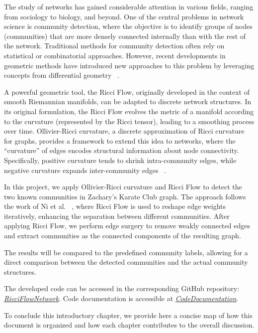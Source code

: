 The study of networks has gained considerable attention in various fields, ranging from sociology to biology, and beyond. One of the central problems in network science is community detection, where the objective is to identify groups of nodes (communities) that are more densely connected internally than with the rest of the network. Traditional methods for community detection often rely on statistical or combinatorial approaches. However, recent developments in geometric methods have introduced new approaches to this problem by leveraging concepts from differential geometry ~\cite{Ni:communitydetectionnetworksricci}.

A powerful geometric tool, the Ricci Flow, originally developed in the context of smooth Riemannian manifolds, can be adapted to discrete network structures. In its original formulation, the Ricci Flow evolves the metric of a manifold according to the curvature (represented by the Ricci tensor), leading to a smoothing process over time. Ollivier-Ricci curvature, a discrete approximation of Ricci curvature for graphs, provides a framework to extend this idea to networks, where the “curvature” of edges encodes structural information about node connectivity. Specifically, positive curvature tends to shrink intra-community edges, while negative curvature expands inter-community edges ~\cite{Ni:communitydetectionnetworksricci}.

In this project, we apply Ollivier-Ricci curvature and Ricci Flow to detect the two known communities in Zachary's Karate Club graph. The approach follows the work of Ni et al. ~\cite{Ni:communitydetectionnetworksricci}, where Ricci Flow is used to reshape edge weights iteratively, enhancing the separation between different communities. After applying Ricci Flow, we perform edge surgery to remove weakly connected edges and extract communities as the connected components of the resulting graph.

The results will be compared to the predefined community labels, allowing for a direct comparison between the detected communities and the actual community structures. 

The developed code can be accessed in the corresponding GitHub repository: \textit{\href{https://github.com/fabbri-lorenzo/RicciFlowNetwork}{RicciFlowNetwork}}.
Code documentation is accessible at \textit{\href{https://fancy-dodol-4d2c6d.netlify.app/}{CodeDocumentation}}.

To conclude this introductory chapter, we provide here a concise map of how this document is organized and how each chapter contributes to the overall discussion.

